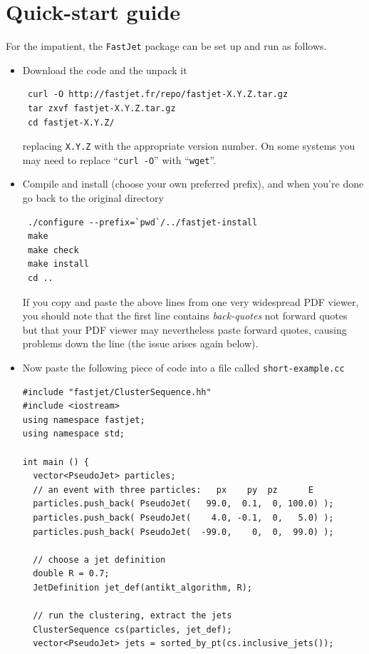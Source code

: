 \documentclass[12pt,a4]{article}
\newcommand{\fastjet}{\texttt{FastJet}\xspace}
\newcommand{\ttt}[1]{{\small\texttt{#1}}}
\begin{document}
\section{Quick-start guide}
\label{sec:quick-start}

For the impatient, the \fastjet package can be set up and run as follows.

\begin{itemize}
\item Download the code and the unpack it
\begin{verbatim}
 curl -O http://fastjet.fr/repo/fastjet-X.Y.Z.tar.gz 
 tar zxvf fastjet-X.Y.Z.tar.gz
 cd fastjet-X.Y.Z/
\end{verbatim}
replacing \ttt{X.Y.Z} with the appropriate version number. On some
systems you may need to replace ``\texttt{curl -O}'' with
``\texttt{wget}''. 

\item Compile and install (choose your own preferred prefix), and when 
you're done go back to the original directory
\begin{verbatim}
 ./configure --prefix=`pwd`/../fastjet-install
 make
 make check
 make install
 cd ..
\end{verbatim}
If you copy and paste the above lines from one very widespread PDF
viewer, you should note that the first line contains \emph{back-quotes}
not forward quotes but that your PDF viewer may nevertheless paste
forward quotes, causing problems down the line (the issue arises again
below). 

\item
Now paste the following piece of code into a file called \tt{short-example.cc}
\begin{lstlisting}
#include "fastjet/ClusterSequence.hh"
#include <iostream>
using namespace fastjet;
using namespace std;

int main () {
  vector<PseudoJet> particles;
  // an event with three particles:   px    py  pz      E
  particles.push_back( PseudoJet(   99.0,  0.1,  0, 100.0) ); 
  particles.push_back( PseudoJet(    4.0, -0.1,  0,   5.0) ); 
  particles.push_back( PseudoJet(  -99.0,    0,  0,  99.0) );

  // choose a jet definition
  double R = 0.7;
  JetDefinition jet_def(antikt_algorithm, R);

  // run the clustering, extract the jets
  ClusterSequence cs(particles, jet_def);
  vector<PseudoJet> jets = sorted_by_pt(cs.inclusive_jets());


\end{lstlisting}
\end{itemize}
\end{document}
